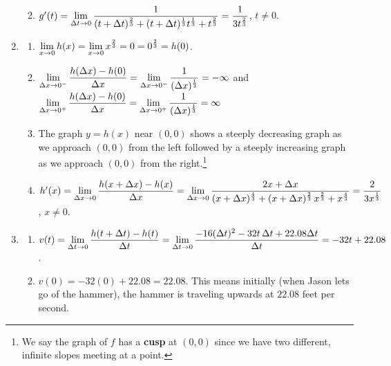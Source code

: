\begin{enumerate}
\begin{enumerate}
\smallskip

\item   $g'(t) = \displaystyle{ \lim_{\Delta t \rightarrow 0} \dfrac{1}{(t+\Delta t)^{\frac{2}{3}} + (t+\Delta t)^{\frac{1}{3}} t^{\frac{1}{3}} + t^{\frac{2}{3}}} = \dfrac{1}{3 t^{\frac{2}{3}}} }$, $t \neq 0$.

\end{enumerate}

\item \begin{enumerate}  \item $\displaystyle{\lim_{x \rightarrow 0} h(x) = \lim_{x \rightarrow 0} x^{\frac{2}{3}} = 0 = 0^{\frac{2}{3}} = h(0)}$. 

\item $\displaystyle{\lim_{\Delta x \rightarrow 0^{-}} \dfrac{h(\Delta x) - h(0)}{\Delta x} = \lim_{\Delta x \rightarrow 0^{-}} \dfrac{1}{(\Delta x)^{\frac{1}{3}}} = -\infty}$ and  $\displaystyle{\lim_{\Delta x \rightarrow 0^{+}} \dfrac{h(\Delta x) - h(0)}{\Delta x} = \lim_{\Delta x \rightarrow 0^{+}} \dfrac{1}{(\Delta x)^{\frac{1}{3}}} = \infty}$

\smallskip
        
\item  The graph $y = h(x)$ near $(0,0)$ shows a steeply decreasing graph as we approach $(0,0)$ from the left followed by a steeply increasing graph as we approach $(0,0)$ from the right.\footnote{We say the graph of $f$ has a  \textbf{cusp} at $(0,0)$ since we have two different, infinite slopes meeting at a point.}

\smallskip

\item  $h'(x) =  \displaystyle{\lim_{\Delta x \rightarrow 0} \dfrac{h(x+\Delta x) - h(x)}{\Delta x} = \lim_{\Delta x \rightarrow 0} \dfrac{2x + \Delta x}{(x+\Delta x)^{\frac{4}{3}} + (x+\Delta x)^{\frac{2}{3}} \, x^{\frac{2}{3}} + x^{\frac{4}{3}}} = \dfrac{2}{3x^{\frac{1}{3}}}}$, $x \neq 0$.
\end{enumerate}

\item  \begin{enumerate}

\item  $v(t) = \displaystyle{\lim_{\Delta t \rightarrow 0} \dfrac{h(t + \Delta t) - h(t)}{\Delta t} = \lim_{\Delta t \rightarrow 0} \dfrac{-16(\Delta t)^2 -32 t \, \Delta t + 22.08 \Delta t}{\Delta t}  = -32t + 22.08}$.

\item   $v(0) = -32(0) + 22.08 = 22.08$. This means initially (when Jason lets go of the hammer), the hammer is traveling upwards at $22.08$ feet per second.


\end{enumerate}
\end{enumerate}
